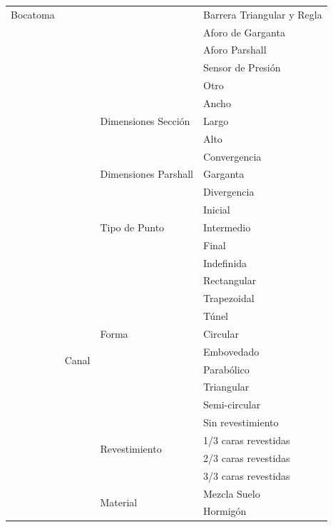 \documentclass[]{article}
\begin{document}
\begin{longtable}{|p{3cm}|p{3.5cm}|p{3.5cm}|p{3.5cm}|}
    \cline{4-4}
    Bocatoma & & & Barrera Triangular y Regla\\
    \cline{4-4}
    & & & Aforo de Garganta\\
    \cline{4-4}
    & & & Aforo Parshall\\
    \cline{4-4}
    & & & Sensor de Presión\\
    \cline{4-4}
    & & & Otro\\
    \cline{3-4}
    & & \multirow {3}{3.5cm}{Dimensiones Sección} & Ancho\\
    \cline{4-4}
    & & & Largo\\
    \cline{4-4}
    & & & Alto\\
    \cline{3-4}
    & & \multirow {3}{3.5cm}{Dimensiones Parshall} & Convergencia\\
    \cline{4-4}
    & & & Garganta\\
    \cline{4-4}
    & & & Divergencia\\ 
    \hline   
    \multirow {70}{3cm}{} & \multirow {39}{3.5cm}{Canal} & \multirow {3}{3.5cm}{Tipo de Punto} &  Inicial\\
	\cline{4-4}
	& & & Intermedio\\
	\cline{4-4}
	& & & Final\\
    \cline{3-4}
    & & \multirow {9}{3.5cm}{Forma} & Indefinida\\
    \cline{4-4}
    & & & Rectangular\\
    \cline{4-4}
    & & & Trapezoidal\\
    \cline{4-4}
    & & & Túnel\\
    \cline{4-4}
    & & & Circular\\
    \cline{4-4}
    & & & Embovedado\\
    \cline{4-4}
    & & & Parabólico\\
    \cline{4-4}
    & & & Triangular\\
    \cline{4-4}
    & & & Semi-circular\\
    \cline{3-4}
	Canal & & \multirow {4}{3.5cm}{Revestimiento} & Sin revestimiento\\
    \cline{4-4}
    & & & 1/3 caras revestidas\\
    \cline{4-4}
    & & & 2/3 caras revestidas\\
    \cline{4-4}
    & & & 3/3 caras revestidas\\
    \cline{3-4}  
    & & \multirow {20}{3.5cm}{Material} & Mezcla Suelo\\
    \cline{4-4}
    & & & Hormigón\\

\end{longtable}
\end{document}
